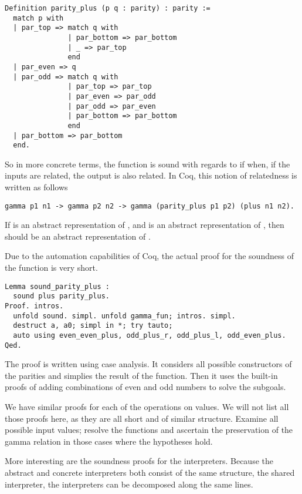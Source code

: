 \begin{verbatim}
Definition parity_plus (p q : parity) : parity :=
  match p with 
  | par_top => match q with
               | par_bottom => par_bottom
               | _ => par_top
               end
  | par_even => q
  | par_odd => match q with
               | par_top => par_top
               | par_even => par_odd
               | par_odd => par_even
               | par_bottom => par_bottom
               end
  | par_bottom => par_bottom
  end.
\end{verbatim}

So in more concrete terms, the function  is sound with 
regards to 
if when, if the inputs are related, the output is also related. In Coq, this 
notion of relatedness is written as follows

\begin{verbatim}
gamma p1 n1 -> gamma p2 n2 -> gamma (parity_plus p1 p2) (plus n1 n2).
\end{verbatim}

If  is an abstract representation of , and  is an 
abstract representation of , then  should be an 
abstract representation of . 

Due to the automation capabilities of Coq, the actual proof for the soundness
of the  function is very short.

\begin{verbatim}
Lemma sound_parity_plus :
  sound plus parity_plus.
Proof. intros.
  unfold sound. simpl. unfold gamma_fun; intros. simpl. 
  destruct a, a0; simpl in *; try tauto;
  auto using even_even_plus, odd_plus_r, odd_plus_l, odd_even_plus.
Qed.
\end{verbatim}

The proof is written using case analysis. It considers all possible
constructors of the parities and simplies the result of the 
function. Then it uses the built-in proofs of adding combinations of even and
odd numbers to solve the subgoals.

We have similar proofs for each of the operations on values. We will not list
all those proofs here, as they are all short and of similar structure. Examine
all possible input values; resolve the functions and ascertain the preservation
of the gamma relation in those cases where the hypotheses hold.

More interesting are the soundness proofs for the interpreters. Because the
abstract and concrete interpreters both consist of the same structure, the
shared interpreter, the interpreters can be decomposed along the same lines.


